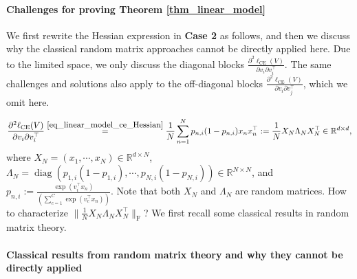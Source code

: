 \documentclass{article}
\newcommand{\1}{^{(1)}}
\newcommand{\2}{^{(2)}}
\renewcommand{\l}{\left}
\renewcommand{\r}{\right}
\begin{document}
\paragraph{Challenges for proving Theorem \ref{thm_linear_model}} 


We first rewrite the Hessian expression in {\bf Case 2} as follows, and then we discuss why the classical random matrix approaches cannot be directly applied here. Due to the limited space, we only discuss the diagonal blocks $\frac{\partial^2\ell_{\text{CE}}(V)}{\partial v_i  \partial v_i^\top}$.  The same challenges and solutions also apply to the off-diagonal blocks $\frac{\partial^2\ell_{\text{CE}}(V)}{\partial v_i  \partial v_j^\top}$, which we omit here.


\begin{equation}
\label{eq_linear_model_ce_Hessian_rewrite}
    \frac{\partial^2\ell_{\text{CE}}(V)}{\partial v_i  \partial v_i^\top} \overset{\eqref{eq_linear_model_ce_Hessian}}{=} \frac{1}{N}\sum_{n= 1}^N  p_{n,i} (1-p_{n,i}) x_n x_n^\top   :=\frac{1}{N} X_N \Lambda_N X_N^\top \in \mathbb{R}^{d\times d}, 
\end{equation}
where $X_N  = (x_1, \cdots, x_N) \in \mathbb{R}^{d\times N}$,  $\Lambda_N = \operatorname{diag}( p_{1,i} (1-p_{1,i}), \cdots,  p_{N,i} (1-p_{N,i})) \in \mathbb{R}^{N\times N}$, and $p_{n,i} := \frac{\exp({v_i^\top x_n})}{\l({\sum_{c=1}^C\exp({v_c^\top x_n})}\r)}$. Note that both $X_N$ and $\Lambda_N$ are random matrices.  How to characterize $\|\frac{1}{N} X_N \Lambda_N X_N^\top\|_{\operatorname{F}}$? We first recall some classical results in random matrix theory.

\paragraph{Classical results from random matrix theory and why they cannot be directly applied} 
\end{document}
